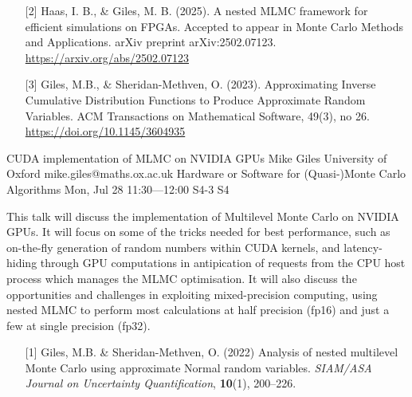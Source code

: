 \begin{talk}
\begin{enumerate}
    \item[{[2]}] Haas, I. B., \& Giles, M. B. (2025). A nested MLMC framework for efficient simulations on FPGAs. Accepted to appear in Monte Carlo Methods and Applications. arXiv preprint arXiv:2502.07123. \url{https://arxiv.org/abs/2502.07123}

     \item[{[3]}] Giles, M.B., \& Sheridan-Methven, O. (2023). Approximating Inverse Cumulative Distribution Functions to Produce Approximate Random Variables. ACM Transactions on Mathematical Software, 49(3), no 26. \url{https://doi.org/10.1145/3604935}
\end{enumerate}

\end{talk}

\begin{talk}
  {CUDA implementation of MLMC on NVIDIA GPUs}%
  {Mike Giles}%
  {University of Oxford}%
  {mike.giles@maths.ox.ac.uk}%
  {Hardware or Software for (Quasi-)Monte Carlo Algorithms}%
  {}%
  {Mon, Jul 28 11:30---12:00}%
  {S4-3}%
  {S4}%
    
   

This talk will discuss the implementation of Multilevel Monte Carlo
on NVIDIA GPUs.  It will focus on some of the tricks needed for best
performance, such as on-the-fly generation of random numbers within
CUDA kernels, and latency-hiding through GPU computations in antipication
of requests from the CPU host process which manages the MLMC optimisation.
It will also discuss the opportunities and challenges in exploiting
mixed-precision computing, using nested MLMC to perform most calculations
at half precision (fp16) and just a few at single precision (fp32).

\medskip

\begin{enumerate}
\item[{[1]}] Giles, M.B. \& Sheridan-Methven, O. (2022)
  Analysis of nested multilevel Monte Carlo using approximate
  Normal random variables. {\it SIAM/ASA
Journal on Uncertainty Quantification}, \textbf{10}(1), 200--226.
\end{enumerate}

\end{talk}


